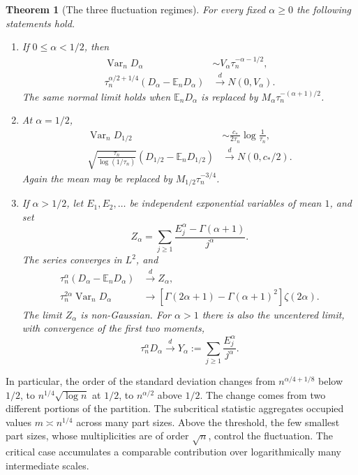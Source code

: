 \documentclass[11pt,letterpaper]{article}
\numberwithin{equation}{section}
\newtheorem{theorem}{Theorem}[section]
\theoremstyle{definition}\newtheorem{definition}[theorem]{Definition}
\theoremstyle{remark}\newtheorem{remark}[theorem]{Remark}
\newcommand{\E}{\mathbb E}
\newcommand{\dto}{\xrightarrow{\ d\ }}
\DeclareMathOperator{\Var}{Var}
\begin{document}
\begin{theorem}[The three fluctuation regimes]\label{dmv:fl:thm:phase}
For every fixed $\alpha\ge0$ the following statements hold.
\begin{enumerate}[label=\textnormal{(\roman*)},leftmargin=*]
\item If $0\le\alpha<1/2$, then
\begin{align}\label{dmv:fl:eq:lowphase}
 \Var_n D_\alpha&\sim V_\alpha\tau_n^{-\alpha-1/2},\\
 \tau_n^{\alpha/2+1/4}(D_\alpha-\E_nD_\alpha)
       &\dto N(0,V_\alpha).
 \nonumber
\end{align}
The same normal limit holds when $\E_nD_\alpha$ is replaced by
$M_\alpha\tau_n^{-(\alpha+1)/2}$.
\item At $\alpha=1/2$,
\begin{align}\label{dmv:fl:eq:criticalphase}
 \Var_nD_{1/2}&\sim\frac{c_*}{2\tau_n}\log\frac1{\tau_n},\\
 \sqrt{\frac{\tau_n}{\log(1/\tau_n)}}
       (D_{1/2}-\E_nD_{1/2})&\dto N(0,c_*/2).
 \nonumber
\end{align}
Again the mean may be replaced by $M_{1/2}\tau_n^{-3/4}$.
\item If $\alpha>1/2$, let $E_1,E_2,\ldots$ be independent exponential
variables of mean $1$, and set
\begin{equation}\label{dmv:fl:eq:Zalpha}
 Z_\alpha=\sum_{j\ge1}\frac{E_j^\alpha-\Gamma(\alpha+1)}{j^\alpha}.
\end{equation}
The series converges in $L^2$, and
\begin{align}\label{dmv:fl:eq:highphase}
 \tau_n^\alpha(D_\alpha-\E_nD_\alpha)&\dto Z_\alpha,\\
 \tau_n^{2\alpha}\Var_nD_\alpha&\longrightarrow
 [\Gamma(2\alpha+1)-\Gamma(\alpha+1)^2]\zeta(2\alpha).
 \nonumber
\end{align}
The limit $Z_\alpha$ is non-Gaussian. For $\alpha>1$ there is also the
uncentered limit, with convergence of the first two moments,
\begin{equation}\label{dmv:fl:eq:uncentered}
 \tau_n^\alpha D_\alpha\dto
 Y_\alpha:=\sum_{j\ge1}\frac{E_j^\alpha}{j^\alpha}.
\end{equation}
\end{enumerate}
\end{theorem}

In particular, the order of the standard deviation changes from
$n^{\alpha/4+1/8}$ below $1/2$, to $n^{1/4}\sqrt{\log n}$ at $1/2$,
to $n^{\alpha/2}$ above $1/2$. The change comes from two different
portions of the partition. The subcritical statistic aggregates occupied
values $m\asymp n^{1/4}$ across many part sizes. Above the threshold,
the few smallest part sizes, whose multiplicities are of order $\sqrt n$,
control the fluctuation. The critical case accumulates a comparable
contribution over logarithmically many intermediate scales.
\end{document}
